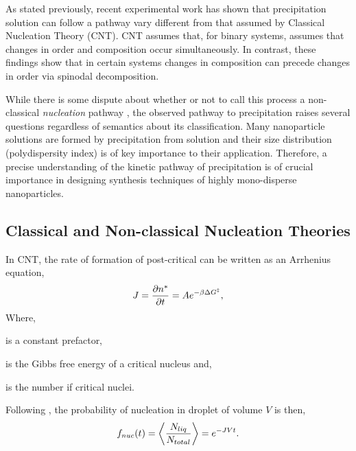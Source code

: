 
As stated previously, recent experimental work has shown that precipitation
solution can follow a pathway vary different from that assumed by Classical
Nucleation Theory (CNT)\cite{LOH17, WALLACE13}. CNT assumes that, for binary
systems, assumes that changes in order and composition occur simultaneously. In
contrast, these findings show that in certain systems changes in composition
can precede changes in order via spinodal decomposition.

While there is some dispute about whether or not to call this process a
non-classical \textit{nucleation} pathway \cite{DAVEY13, GEBAUER11}, the
observed pathway to precipitation raises several questions regardless of
semantics about its classification. Many nanoparticle solutions are formed
by precipitation from solution and their size distribution (polydispersity
index) is of key importance to their application. Therefore, a precise
understanding of the kinetic pathway of precipitation is of crucial importance
in designing synthesis techniques of highly mono-disperse nanoparticles.

\subsection{Classical and Non-classical Nucleation Theories} %


In CNT, the rate of formation of post-critical can be written as an Arrhenius
equation,
%
\begin{equation}
    J = \frac{\partial n^*}{\partial t} = A e^{-\beta\Delta G^{\ddagger}},
\end{equation}
Where,
\begin{description}[labelwidth=1cm, align=right]
    \item[$A$] is a constant prefactor,
    \item[$\Delta G^\ddagger$] is the Gibbs free energy of a critical nucleus
    and, 
    \item[$n^*$] is the number if critical nuclei.
\end{description}
% 
Following \cite{MYERSON04}, the probability of nucleation in droplet of volume
$V$ is then,
%
\begin{equation}
    f_{nuc}(t) = \left\langle \frac{N_{liq}}{N_{total}} \right\rangle = e^{-J V t}.
\end{equation}

